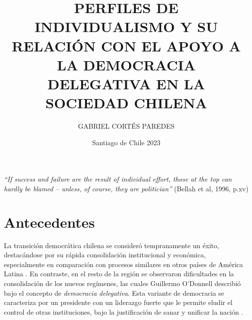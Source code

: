 \documentclass[12pt,twoside]{templates/facsothesis}
\title{PERFILES DE INDIVIDUALISMO Y SU RELACIÓN CON EL APOYO A LA DEMOCRACIA DELEGATIVA EN LA SOCIEDAD CHILENA}
\author{GABRIEL CORTÉS PAREDES}
\date{Santiago de Chile 2023}
\begin{document}
\raggedbottom

  \maketitle

\frontmatter %
 \pagestyle{empty} 


  \begin{prefacio}
  \thispagestyle{empty}
    \emph{``If success and failure are the result of individual effort, those at the top can hardly be blamed -- unless, of course, they are politician''} (Bellah et al, 1996, p.xv)
  \end{prefacio}

  \setcounter{tocdepth}{1}
  \setlength{\parskip}{0pt}
  \tableofcontents
  \thispagestyle{empty}

\setlength\parskip{1em plus 0.1em minus 0.2em}

  \listoftables
  \thispagestyle{empty}

  \listoffigures
  \thispagestyle{empty}



\mainmatter %
\titleformat{\chapter}{\normalfont\Huge\bfseries}{\thechapter}{1em}{}
\pagestyle{fancyplain} %

\hypertarget{antecedentes}{%
\chapter{Antecedentes}\label{antecedentes}}

La transición democrática chilena se consideró tempranamente un éxito, destacándose por su rápida consolidación institucional y económica, especialmente en comparación con procesos similares en otros países de América Latina \citep{odonnell1994}. En contraste, en el resto de la región se observaron dificultades en la consolidación de los nuevos regímenes, las cuales Guillermo O'Donnell \citeyearpar{odonnell1994} describió bajo el concepto de \emph{democracia delegativa}. Esta variante de democracia se caracteriza por un presidente con un liderazgo fuerte que le permite eludir el control de otras instituciones, bajo la justificación de sanar y unificar la nación \citep{odonnell1994}.
\end{document}
